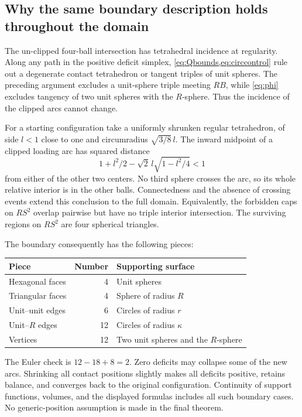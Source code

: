 \documentclass[11pt]{article}
\numberwithin{equation}{section}
\theoremstyle{definition}\newtheorem{definition}[theorem]{Definition}
\theoremstyle{remark}\newtheorem{remark}[theorem]{Remark}
\begin{document}
\subsection{Why the same boundary description holds throughout the domain}
The un-clipped four-ball intersection has tetrahedral incidence at regularity.
Along any path in the positive deficit simplex, \cref{eq:Qbounds,eq:circcontrol}
rule out a degenerate contact tetrahedron or tangent triples of unit spheres.
The preceding argument excludes a unit-sphere triple meeting $RB$, while
\cref{eq:phi} excludes tangency of two unit spheres with the $R$-sphere.
Thus the incidence of the clipped arcs cannot change.

For a starting configuration take a uniformly shrunken regular tetrahedron,
of side $l<1$ close to one and circumradius $\sqrt{3/8}\,l$. The inward
midpoint of a clipped loading arc has squared distance
\[
 1+l^2/2-\sqrt2\,l\sqrt{1-l^2/4}<1
\]
from either of the other two centers. No third sphere crosses the arc, so
its whole relative interior is in the other balls. Connectedness and the
absence of crossing events extend this conclusion to the full domain.
Equivalently, the forbidden caps on $RS^2$ overlap pairwise but have no triple
interior intersection. The surviving regions on $RS^2$ are four spherical
triangles.

The boundary consequently has the following pieces:
\begin{center}
\begin{tabular}{@{}lrl@{}}
\toprule
Piece & Number & Supporting surface\\
\midrule
Hexagonal faces & 4 & Unit spheres\\
Triangular faces & 4 & Sphere of radius $R$\\
Unit--unit edges & 6 & Circles of radius $r$\\
Unit--$R$ edges & 12 & Circles of radius $\kappa$\\
Vertices & 12 & Two unit spheres and the $R$-sphere\\
\bottomrule
\end{tabular}
\end{center}
The Euler check is $12-18+8=2$. Zero deficits may collapse some of the new
arcs. Shrinking all contact positions slightly makes all deficits positive,
retains balance, and converges back to the original configuration. Continuity
of support functions, volumes, and the displayed formulas includes all such
boundary cases. No generic-position assumption is made in the final theorem.
\end{document}
